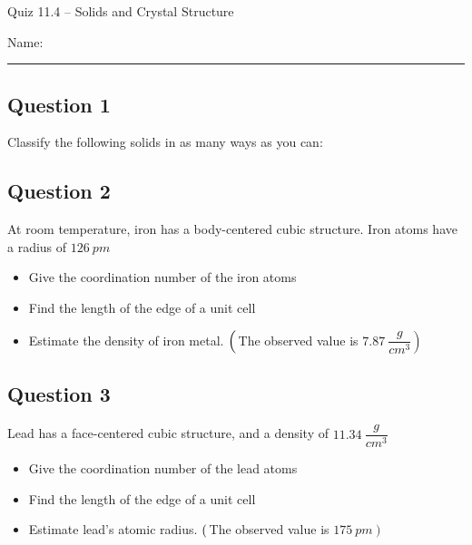 \documentclass[11pt, letterpaper]{memoir}
\begin{document}
	\begin{center}
		{\large	Quiz 11.4 -- Solids and Crystal Structure}
	\end{center}
	{\large Name: \rule[-1mm]{4in}{.1pt} 
	
	\subsection*{Question 1}
	Classify the following solids in as many ways as you can:
	
	
	\vspace{3em}
	\subsection*{Question 2}
	At room temperature, iron has a body-centered cubic structure. Iron atoms have a radius of $126~pm$
	\begin{itemize}
		\item Give the coordination number of the iron atoms
		\item Find the length of the edge of a unit cell
		\item Estimate the density of iron metal. $\left(\vphantom{\dfrac{g}{cm^3}}\right.$The observed value is $\left.7.87~\dfrac{g}{cm^3}\right)$
	\end{itemize}
	
	\vspace{9em}
	\subsection*{Question 3}
	Lead has a face-centered cubic structure, and a density of $11.34~\dfrac{g}{cm^3}$
	\begin{itemize}
		\item Give the coordination number of the lead atoms
		\item Find the length of the edge of a unit cell
		\item Estimate lead's atomic radius. $\left(\vphantom{pm}\right.$The observed value is $\left.175~pm\right)$
	\end{itemize}

	\newpage
	\pagestyle{empty}
	\addtocounter{page}{-1}
}
\end{document}
